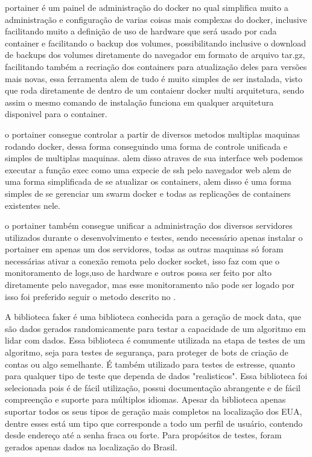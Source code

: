 \documentclass[
	12pt,				%
	openright,			%
	oneside,			%
	a4paper,			%
	english,			%
	french,				%
	spanish,			%
	brazil,				%
	]{abntex2}
\begin{document}
portainer é um painel de administração do docker no qual simplifica muito a administração e configuração de varias coisas mais complexas do docker,
inclusive facilitando muito a definição de uso de hardware que será usado por cada container e facilitando o backup dos volumes,
possibilitando inclusive o download de backups dos volumes diretamente do navegador em formato de arquivo tar.gz,
facilitando também a recriação dos containers para atualização deles para versões mais novas,
essa ferramenta alem de tudo é muito simples de ser instalada,
visto que roda diretamente de dentro de um contaienr docker multi arquitetura,
sendo assim o mesmo comando de instalação funciona em qualquer arquitetura disponivel para o container.

o portainer consegue controlar a partir de diversos metodos multiplas maquinas rodando docker, dessa forma conseguindo uma forma de controle unificada e simples de multiplas maquinas.
alem disso atraves de sua interface web podemos executar a função exec como uma expecie de ssh pelo navegador web alem de uma forma simplificada de se atualizar os containers,
alem disso é uma forma simples de se gerenciar um swarm docker e todas as replicações de containers existentes nele.

o portainer também consegue unificar a administração dos diversos servidores utilizados durante o desenvolvimento e testes,
sendo necessário apenas instalar o portainer em apenas um dos servidores,
todas as outras maquinas só foram necessárias ativar a conexão remota pelo docker socket,
isso faz com que o monitoramento de logs,uso de hardware e outros possa ser feito por alto diretamente pelo navegador,
mas esse monitoramento não pode ser logado por isso foi preferido seguir o metodo descrito no .

\cite{portainer}

A biblioteca faker é uma biblioteca conhecida para a geração de mock data,
que são dados gerados randomicamente para testar a capacidade de um algoritmo em lidar com dados.
Essa biblioteca é comumente utilizada na etapa de testes de um algoritmo, seja para testes de segurança,
para proteger de bots de criação de contas ou algo semelhante. É também utilizado para testes de estresse,
quanto para qualquer tipo de teste que dependa de dados "realisticos".\newline
Essa biblioteca foi selecionada pois é de fácil utilização, 
possui documentação abrangente e de fácil compreenção e suporte para múltiplos idiomas. 
Apesar da biblioteca apenas suportar todos os seus tipos de geração mais completos na localização dos EUA,
dentre esses está um tipo que corresponde a todo um perfil de usuário, contendo desde endereço até a senha fraca ou forte.
Para propósitos de testes, foram gerados apenas dados na localização do Brasil.\newline
\end{document}
